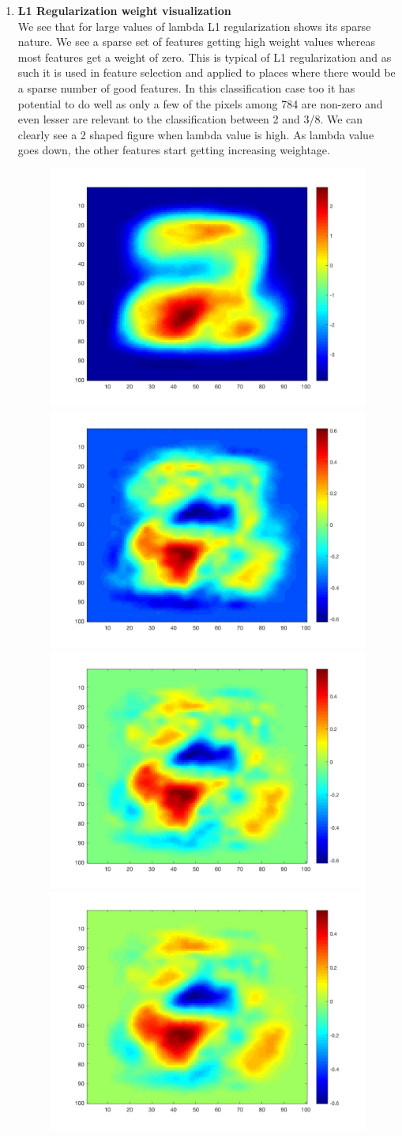 \documentclass[11pt,twoside]{article}
\begin{document}
\begin{enumerate}[label=(\alph*)]
\item \textbf{L1 Regularization weight visualization}\\
We see that for large values of lambda L1 regularization shows its sparse nature. We see a sparse set of features getting  high weight values whereas most features get a weight of zero. This is typical of L1 regularization and as such it is used in feature selection and applied to places where there would be a sparse number of good features. In this classification case too it has potential to do well as only a few of the pixels among 784 are non-zero and even lesser are relevant to the classification between 2 and 3/8. We can clearly see a 2 shaped figure when lambda value is high. As lambda value goes down, the other features start getting increasing weightage.
\begin{figure}[H]
  \includegraphics[width=0.45\columnwidth]{5e_1_l1}
  \includegraphics[width=0.45\columnwidth]{5e_2_l1}\\
  \includegraphics[width=0.45\columnwidth]{5e_3_l1}
  \includegraphics[width=0.45\columnwidth]{5e_4_l1}\\

\end{figure}
\end{enumerate}
\end{document}
